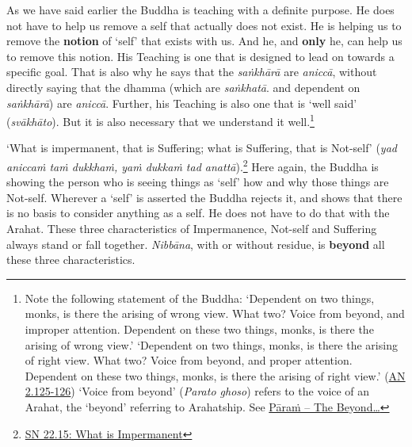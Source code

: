 As we have said earlier the Buddha is teaching with a definite purpose. He does not have to help us remove a self that actually does not exist. He is helping us to remove the \textbf{notion} of `self' that exists with us. And he, and \textbf{only} he, can help us to remove this notion. His Teaching is one that is designed to lead on towards a specific goal. That is also why he says that the \emph{saṅkhārā} are \emph{aniccā}, without directly saying that the dhamma (which are \emph{saṅkhatā}. and dependent on \emph{saṅkhārā}) are \emph{aniccā}. Further, his Teaching is also one that is `well said' (\emph{svākhāto}). But it is also necessary that we understand it well.\footnote{Note the following statement of the Buddha: `Dependent on two things, monks, is there the arising of wrong view. What two? Voice from beyond, and improper attention. Dependent on these two things, monks, is there the arising of wrong view.' `Dependent on two things, monks, is there the arising of right view. What two? Voice from beyond, and proper attention. Dependent on these two things, monks, is there the arising of right view.' (\href{https://suttacentral.net/an2.118-129/en/sujato}{AN 2.125-126}) `Voice from beyond' (\emph{Parato ghoso}) refers to the voice of an Arahat, the `beyond' referring to Arahatship. See \protect\hyperlink{beyond}{Pāraṁ -- The Beyond\ldots\hspace{0pt}}}

`What is impermanent, that is Suffering; what is Suffering, that is Not-self' (\emph{yad aniccaṁ taṁ dukkhaṁ, yaṁ dukkaṁ tad anattā}).\footnote{\href{https://suttacentral.net/sn22.15/en/bodhi}{SN 22.15: What is Impermanent}} Here again, the Buddha is showing the person who is seeing things as `self' how and why those things are Not-self. Wherever a `self' is asserted the Buddha rejects it, and shows that there is no basis to consider anything as a self. He does not have to do that with the Arahat. These three characteristics of Impermanence, Not-self and Suffering always stand or fall together. \emph{Nibbāna}, with or without residue, is \textbf{beyond} all these three characteristics.
